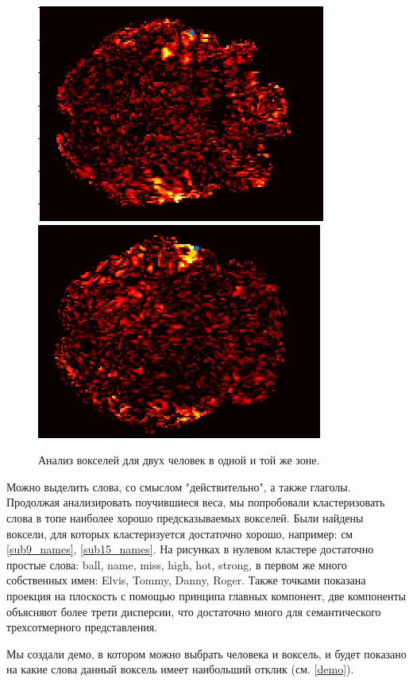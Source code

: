 \documentclass[pdftex,ptm,12pt,a4paper]{report}
\theoremstyle{definition}
\begin{document}
\begin{figure}
\centering
\includegraphics[scale=0.5]{images/voxel_to_choose1.png} 
\includegraphics[scale=0.5]{images/voxel_to_choose2.png} 
\caption{Анализ вокселей для двух человек в одной и той же зоне.}
\label{voxel_to_choose}
\end{figure}

Можно выделить слова, со смыслом "действительно", а также глаголы. Продолжая анализировать поучившиеся веса, мы попробовали кластеризовать слова в топе наиболее хорошо предсказываемых вокселей. Были найдены воксели, для которых кластеризуется достаточно хорошо, например: см \ref{sub9_names}, \ref{sub15_names}. На рисунках в нулевом кластере достаточно простые слова: ball, name, miss, high, hot, strong, в первом же много собственных имен: Elvis, Tommy, Danny, Roger. Также точками показана проекция на плоскость с помощью принципа главных компонент, две компоненты объясняют более трети дисперсии, что достаточно много для семантического трехсотмерного представления.

Мы создали демо, в котором можно выбрать человека и воксель, и будет показано на какие слова данный воксель имеет наибольший отклик (см. \ref{demo}).
\end{document}

